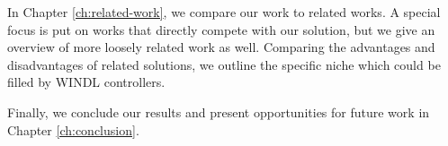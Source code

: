 In Chapter \ref{ch:related-work}, we compare our work to related works. A special focus is put on works that directly compete with our solution, but we give an overview of more loosely related work as well. Comparing the advantages and disadvantages of related solutions, we outline the specific niche which could be filled by \ac{WINDL} controllers.

Finally, we conclude our results and present opportunities for future work in Chapter \ref{ch:conclusion}.

